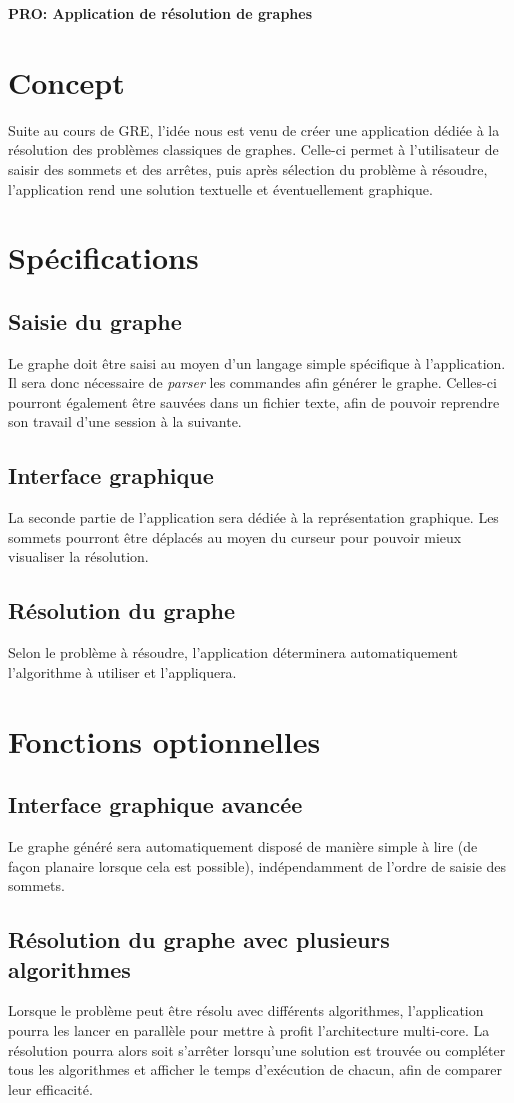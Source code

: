 \documentclass[french]{article}
\begin{document}
	\centering
	\large{\textbf{PRO: Application de résolution de graphes}}
	
	\justify
	
	\section{Concept}
		Suite au cours de GRE, l'idée nous est venu de créer une application dédiée à la résolution des problèmes classiques de graphes. Celle-ci permet à l'utilisateur de saisir des sommets et des arrêtes, puis après sélection du problème à résoudre, l'application rend une solution textuelle et éventuellement graphique.
		
	\section{Spécifications}
		\subsection{Saisie du graphe}
			Le graphe doit être saisi au moyen d'un langage simple spécifique à l'application. Il sera donc nécessaire de \textit{parser} les commandes afin générer le graphe. Celles-ci pourront également être sauvées dans un fichier texte, afin de pouvoir reprendre son travail d'une session à la suivante.
		
		\subsection{Interface graphique}
			La seconde partie de l'application sera dédiée à la représentation graphique. Les sommets pourront être déplacés au moyen du curseur pour pouvoir mieux visualiser la résolution.
		
		\subsection{Résolution du graphe}
			Selon le problème à résoudre, l'application déterminera automatiquement l'algorithme à utiliser et l'appliquera.
	
	\section{Fonctions optionnelles}
		\subsection{Interface graphique avancée}
			Le graphe généré sera automatiquement disposé de manière simple à lire (de façon planaire lorsque cela est possible), indépendamment de l'ordre de saisie des sommets. 
		
		\subsection{Résolution du graphe avec plusieurs algorithmes}
			Lorsque le problème peut être résolu avec différents algorithmes, l'application pourra les lancer en parallèle pour mettre à profit l'architecture multi-core. La résolution pourra alors soit s'arrêter lorsqu'une solution est trouvée ou compléter tous les algorithmes et afficher le temps d'exécution de chacun, afin de comparer leur efficacité.
			
\end{document}
